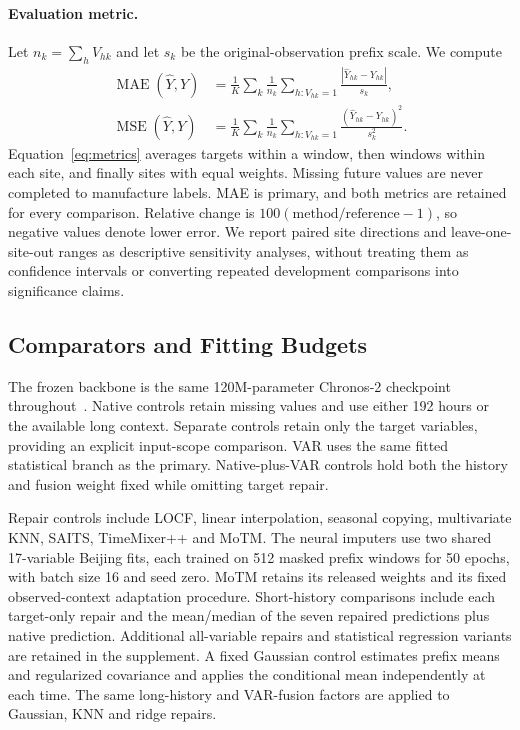 \paragraph{Evaluation metric.}
Let $n_k=\sum_hV_{hk}$ and let $s_k$ be the original-observation prefix scale. We compute
\begin{align}
 \operatorname{MAE}(\widehat Y,Y)&=\frac1K\sum_k\frac1{n_k}
   \sum_{h:V_{hk}=1}\frac{|\widehat Y_{hk}-Y_{hk}|}{s_k},\nonumber\\
 \operatorname{MSE}(\widehat Y,Y)&=\frac1K\sum_k\frac1{n_k}
   \sum_{h:V_{hk}=1}\frac{(\widehat Y_{hk}-Y_{hk})^2}{s_k^2}.
 \label{eq:metrics}
\end{align}
Equation~\ref{eq:metrics} averages targets within a window, then windows within each site, and finally sites with equal weights. Missing future values are never completed to manufacture labels. MAE is primary, and both metrics are retained for every comparison. Relative change is $100(\mathrm{method}/\mathrm{reference}-1)$, so negative values denote lower error. We report paired site directions and leave-one-site-out ranges as descriptive sensitivity analyses, without treating them as confidence intervals or converting repeated development comparisons into significance claims.

\subsection{Comparators and Fitting Budgets}

The frozen backbone is the same 120M-parameter Chronos-2 checkpoint throughout~\citep{ansari2025chronos2}. Native controls retain missing values and use either 192 hours or the available long context. Separate controls retain only the target variables, providing an explicit input-scope comparison. VAR uses the same fitted statistical branch as the primary. Native-plus-VAR controls hold both the history and fusion weight fixed while omitting target repair.

Repair controls include LOCF, linear interpolation, seasonal copying, multivariate KNN, SAITS, TimeMixer++ and MoTM. The neural imputers use two shared 17-variable Beijing fits, each trained on 512 masked prefix windows for 50 epochs, with batch size 16 and seed zero. MoTM retains its released weights and its fixed observed-context adaptation procedure. Short-history comparisons include each target-only repair and the mean/median of the seven repaired predictions plus native prediction. Additional all-variable repairs and statistical regression variants are retained in the supplement. A fixed Gaussian control estimates prefix means and regularized covariance and applies the conditional mean independently at each time. The same long-history and VAR-fusion factors are applied to Gaussian, KNN and ridge repairs.

